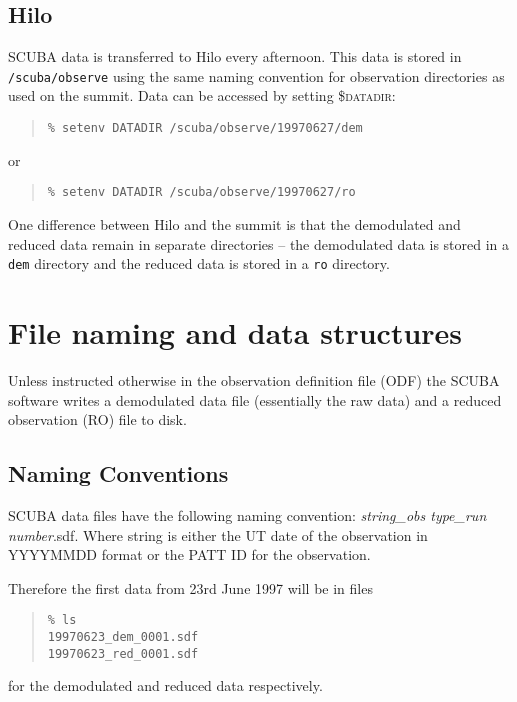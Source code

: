 \documentclass[twoside,11pt]{article}
\newenvironment{myquote}{\begin{quote}\begin{small}}{\end{small}\end{quote}}
\newcommand{\xlabel}[1]{}
\begin{document}
\subsection{Hilo}

SCUBA data is transferred to Hilo every afternoon. This data is stored in
\texttt{/scuba/observe} using the same naming convention for observation
directories as used on the summit. Data can be accessed by setting
\textsc{\$datadir}: %

\begin{myquote}
\begin{verbatim}
% setenv DATADIR /scuba/observe/19970627/dem
\end{verbatim}
\end{myquote}
or
\begin{myquote}
\begin{verbatim}
% setenv DATADIR /scuba/observe/19970627/ro
\end{verbatim}
\end{myquote}


One difference between Hilo and the summit is that the demodulated and reduced
data remain in separate directories -- the demodulated data is stored in a
\texttt{dem} directory and the reduced data is stored in a \texttt{ro}
directory.


\section{\xlabel{filenames}File naming and data structures\label{filenames}}

Unless instructed otherwise in the observation definition file (ODF) the
SCUBA software writes a demodulated data file (essentially the raw data) and a
reduced observation (RO) file to disk. 

\subsection{Naming Conventions}

SCUBA data files have the following naming convention: {\it string\_obs
type\_run number}.sdf. Where string is either the UT date of the observation
in YYYYMMDD format or the PATT ID for the observation.

Therefore the first data from 23rd June 1997 will be in files
\begin{myquote}
\begin{verbatim}
% ls
19970623_dem_0001.sdf
19970623_red_0001.sdf
\end{verbatim}
\end{myquote}
for the demodulated and reduced data respectively.
\end{document}
